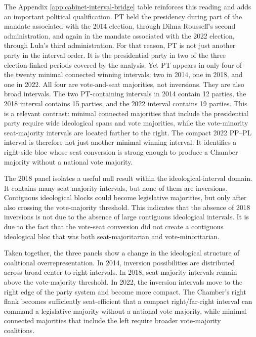 \documentclass[11pt]{article}
\begin{document}
The Appendix \ref{app:cabinet-interval-bridge} table reinforces this reading
and adds an important political qualification. PT held the presidency during
part of the mandate associated with the 2014 election, through Dilma
Rousseff's second administration, and again in the mandate associated with the
2022 election, through Lula's third administration. For that reason, PT is not
just another party in the interval order. It is the presidential party in two of the
three election-linked periods covered by the analysis. Yet PT appears in only
four of the twenty minimal connected winning intervals: two in 2014, one in
2018, and one in 2022. All four are vote-and-seat majorities, not inversions.
They are also broad intervals. The two PT-containing intervals in 2014 contain
12 parties, the 2018 interval contains 15 parties, and the 2022 interval contains
19 parties. This is a relevant contrast: minimal connected majorities that
include the presidential party require wide ideological spans and vote majorities,
while the vote-minority seat-majority intervals are located farther to the right.
The compact 2022 PP--PL interval is therefore not just another minimal winning
interval. It identifies a right-side bloc whose seat conversion is strong enough
to produce a Chamber majority without a national vote majority.

The 2018 panel isolates a useful null result within the ideological-interval
domain. It contains many seat-majority intervals, but none of them are
inversions. Contiguous ideological blocks could
become legislative majorities, but only after also crossing the vote-majority
threshold. This indicates that the absence of 2018 inversions is not due to the
absence of large contiguous ideological intervals. It is due to the fact that the
vote-seat conversion did not create a contiguous ideological bloc that was both
seat-majoritarian and vote-minoritarian.

Taken together, the three panels show a change in the ideological structure of
coalitional overrepresentation. In 2014, inversion possibilities are distributed
across broad center-to-right intervals. In 2018, seat-majority intervals remain
above the vote-majority threshold. In 2022, the inversion intervals move to the
right edge of the party system and become more compact. The Chamber's
right flank becomes sufficiently seat-efficient that a compact right/far-right
interval can command a legislative majority without a national vote majority,
while minimal connected majorities that include the left require broader
vote-majority coalitions.
\end{document}
